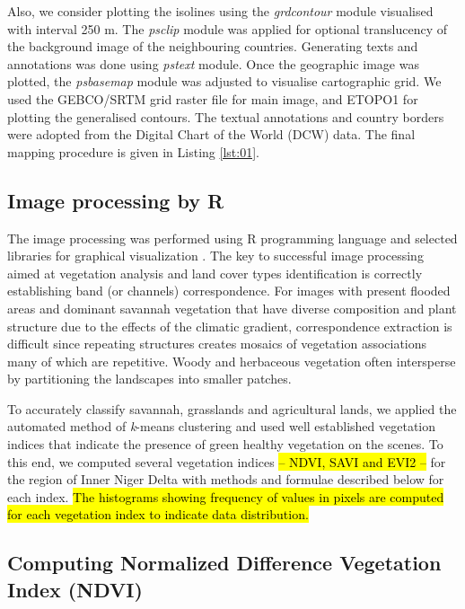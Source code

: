 \documentclass[12pt,a4paper,oneside]{article}
\def \newpar{\vspace{6pt}}
\begin{document}
\newpar Also, we consider plotting the isolines using the \emph{grdcontour} module visualised with interval 250 m. The \emph{psclip} module was applied for optional translucency of the background image of the neighbouring countries. Generating texts and annotations was done using \emph{pstext} module. Once the geographic image was plotted, the \emph{psbasemap} module was adjusted to visualise cartographic grid. We used the GEBCO/SRTM grid raster file for main image, and ETOPO1 for plotting the generalised contours. The textual annotations and country borders were adopted from the Digital Chart of the World (DCW) data. The final mapping procedure is given in Listing \ref{lst:01}.

\subsection*{Image processing by R}

\newpar The image processing was performed using R programming language \citep{RCoreTeam} and selected libraries for graphical visualization \citep{Murrell}. The key to successful image processing aimed at vegetation analysis and land cover types identification is correctly establishing band (or channels) correspondence. For images with present flooded areas and dominant savannah vegetation that have diverse composition and plant structure due to the effects of the climatic gradient, correspondence extraction is difficult since repeating structures creates mosaics of vegetation associations many of which are repetitive. Woody and herbaceous vegetation often intersperse by partitioning the landscapes into smaller patches. 

\newpar To accurately classify savannah, grasslands and agricultural lands, we applied the automated method of \emph{k}-means clustering and used well established vegetation indices that indicate the presence of green healthy vegetation on the scenes. To this end, we computed several vegetation indices \hl{-- NDVI, SAVI and EVI2 --} for the region of Inner Niger Delta with methods and formulae described below for each index. \hl{The histograms showing frequency of values in pixels are computed for each vegetation index to indicate data distribution.}

\subsection*{Computing Normalized Difference Vegetation Index (NDVI)}
\end{document}
